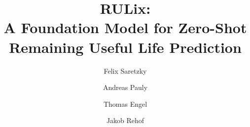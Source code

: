 \documentclass[5p,times,procedia]{elsarticle}
\begin{document}
\begin{frontmatter}



%

\title{RULix:\\A Foundation Model for Zero-Shot Remaining Useful Life Prediction}




\author[a]{Felix Saretzky}
\author[b,c]{Andreas Pauly}
\author[a]{Thomas Engel}
\author[b,c]{Jakob Rehof}

\address[a]{SECAN-Lab, University of Luxembourg, Luxembourg}
\address[b]{Department of Computer Science, TU Dortmund University, Dortmund, Germany}
\address[c]{Lamarr Institute, Dortmund, Germany}



\end{frontmatter}
\end{document}
